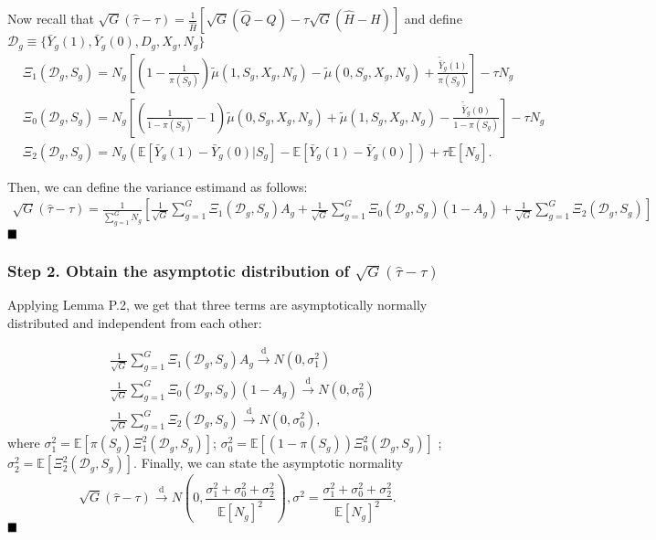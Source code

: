 \documentclass{article}
\renewcommand{\qed}{\hfill\blacksquare}
\begin{document}
 Now recall that $\sqrt{G}(\hat{\tau} - \tau) = \frac{1}{\hat{H}} \left[\sqrt{G}(\hat{Q} - Q)- \tau \sqrt{G}(\hat{H} - H)\right]$ and define $\mathcal D_g \equiv \{\bar{Y}_g(1),\bar{Y}_g(0),D_g,X_g, N_g\}$
 \begin{align}
 	&\Xi_1(\mathcal D_g,S_g) = N_g \left[ \left(1 - \frac{1}{\pi(S_g)}\right) \tilde{\mu}(1,S_g,X_g,N_g) - \tilde{\mu}(0,S_g,X_g,N_g) + \frac{\tilde{\bar{Y}}_g(1)}{\pi(S_g)}\right] - \tau N_g \nonumber \\
 	&\Xi_0(\mathcal D_g,S_g) = N_g \left[ \left(\frac{1}{1-\pi(S_g)} - 1\right) \tilde{\mu}(0,S_g,X_g,N_g) + \tilde{\mu}(1,S_g,X_g,N_g) - \frac{\tilde{\bar{Y}}_g(0)}{1-\pi(S_g)}\right] - \tau N_g \nonumber \\
 	&\Xi_2(\mathcal D_g,S_g) = N_g \left( \mathbb E[\bar{Y}_g(1) - \bar{Y}_g(0) |S_g] - \mathbb E[\bar{Y}_g(1) - \bar{Y}_g(0)] \right) + \tau \mathbb E[N_g] \nonumber .
 \end{align}
 
 Then, we can define the variance estimand as follows:
 \begin{align}
 \sqrt{G}(\hat{\tau} - \tau) = \frac{1}{\sum_{g=1}^G N_g} \left[ \frac{1}{\sqrt{G}} \sum_{g=1}^G \Xi_1(\mathcal D_g,S_g) A_g + \frac{1}{\sqrt{G}} \sum_{g=1}^G \Xi_0(\mathcal D_g, S_g) (1 - A_g) + \frac{1}{\sqrt{G}} \sum_{g=1}^G \Xi_2(\mathcal D_g, S_g) \right] \nonumber	
 \end{align}
\hfill $\qed$

\subsubsection*{Step 2. Obtain the asymptotic distribution of $\sqrt{G}(\hat{\tau} - \tau)$}
Applying Lemma P.2, we get that three terms are asymptotically normally distributed and independent from each other:

\begin{align}
	&\frac{1}{\sqrt{G}} \sum_{g=1}^{G} \Xi_1(\mathcal D_g, S_g) A_g \xrightarrow{\text{d}}N(0,\sigma_1^2) \nonumber \\
	&\frac{1}{\sqrt{G}} \sum_{g=1}^{G} \Xi_0(\mathcal D_g, S_g) (1-A_g) \xrightarrow{\text{d}}N(0,\sigma_0^2) \nonumber \\
	&\frac{1}{\sqrt{G}} \sum_{g=1}^{G} \Xi_2(\mathcal D_g, S_g) \xrightarrow{\text{d}}N(0,\sigma_0^2), \nonumber
\end{align}
where $\sigma_1^2 = \mathbb E[\pi(S_g) \Xi_1^2(\mathcal D_g, S_g)]$; $\sigma_0^2 = \mathbb E[(1-\pi(S_g)) \Xi_0^2(\mathcal D_g, S_g)]$ ; $\sigma_2^2 = \mathbb E[\Xi_2^2(\mathcal D_g, S_g)]$. Finally, we can state the asymptotic normality
\[\sqrt{G}(\hat{\tau} - \tau) \xrightarrow{\text{d}}N\left(0,\frac{\sigma^2_1 + \sigma_0^2 + \sigma_2^2}{\mathbb E[N_g]^2}\right), \sigma^2 = \frac{\sigma^2_1 + \sigma_0^2 + \sigma_2^2}{\mathbb E[N_g]^2}.\]
\hfill $\qed$
\end{document}
